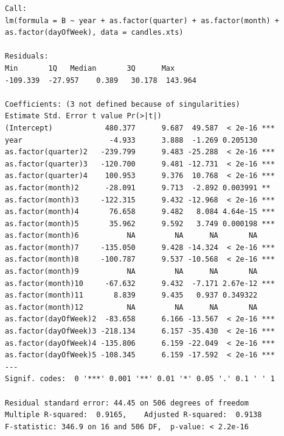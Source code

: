 \documentclass[a4paper,11pt]{article}
\begin{document}
\begin{lstlisting}
Call:
lm(formula = B ~ year + as.factor(quarter) + as.factor(month) + 
as.factor(dayOfWeek), data = candles.xts)

Residuals:
Min       1Q   Median       3Q      Max 
-109.339  -27.957    0.389   30.178  143.964 

Coefficients: (3 not defined because of singularities)
Estimate Std. Error t value Pr(>|t|)    
(Intercept)            480.377      9.687  49.587  < 2e-16 ***
year                    -4.933      3.888  -1.269 0.205130    
as.factor(quarter)2   -239.799      9.483 -25.288  < 2e-16 ***
as.factor(quarter)3   -120.700      9.481 -12.731  < 2e-16 ***
as.factor(quarter)4    100.953      9.376  10.768  < 2e-16 ***
as.factor(month)2      -28.091      9.713  -2.892 0.003991 ** 
as.factor(month)3     -122.315      9.432 -12.968  < 2e-16 ***
as.factor(month)4       76.658      9.482   8.084 4.64e-15 ***
as.factor(month)5       35.962      9.592   3.749 0.000198 ***
as.factor(month)6           NA         NA      NA       NA    
as.factor(month)7     -135.050      9.428 -14.324  < 2e-16 ***
as.factor(month)8     -100.787      9.537 -10.568  < 2e-16 ***
as.factor(month)9           NA         NA      NA       NA    
as.factor(month)10     -67.632      9.432  -7.171 2.67e-12 ***
as.factor(month)11       8.839      9.435   0.937 0.349322    
as.factor(month)12          NA         NA      NA       NA    
as.factor(dayOfWeek)2  -83.658      6.166 -13.567  < 2e-16 ***
as.factor(dayOfWeek)3 -218.134      6.157 -35.430  < 2e-16 ***
as.factor(dayOfWeek)4 -135.806      6.159 -22.049  < 2e-16 ***
as.factor(dayOfWeek)5 -108.345      6.159 -17.592  < 2e-16 ***
---
Signif. codes:  0 '***' 0.001 '**' 0.01 '*' 0.05 '.' 0.1 ' ' 1

Residual standard error: 44.45 on 506 degrees of freedom
Multiple R-squared:  0.9165,	Adjusted R-squared:  0.9138 
F-statistic: 346.9 on 16 and 506 DF,  p-value: < 2.2e-16
\end{lstlisting}
\end{document}

